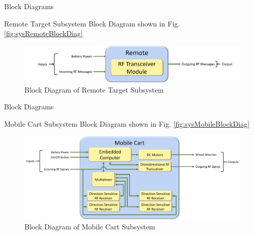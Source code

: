 \documentclass{beamer}
\begin{document}

\begin{frame}{Block Diagrams}
  \begin{block}{}
    Remote Target Subsystem Block Diagram shown in Fig. \autoref{fig:sysRemoteBlockDiag}
  \end{block}
  \begin{figure}[b]
    \centering
    \includegraphics[width=\textwidth]{figs/img/remoteBlockDiagram.png}
    \caption{Block Diagram of Remote Target Subsystem}
    \label{fig:sysRemoteBlockDiag}
  \end{figure}
\end{frame}


\begin{frame}{Block Diagrams}
  \begin{block}{}
    Mobile Cart Subsystem Block Diagram shown in Fig. \autoref{fig:sysMobileBlockDiag}
  \end{block}
  \begin{figure}[b]
    \centering
    \includegraphics[width=\textwidth]{figs/img/mobileCartBlockDiagram.png}
    \caption{Block Diagram of Mobile Cart Subsystem}
    \label{fig:sysMobileBlockDiag}
  \end{figure}
\end{frame}

\end{document}
